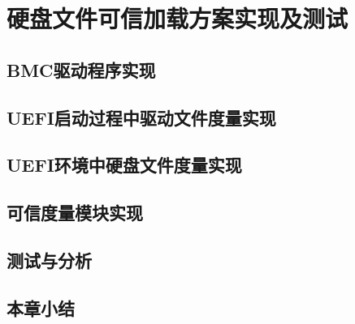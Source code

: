 %
%
\chapter{硬盘文件可信加载方案实现及测试}
\label{cha:test}
%
%
\section{BMC驱动程序实现}
%
%
\section{UEFI启动过程中驱动文件度量实现}
%
%
\section{UEFI环境中硬盘文件度量实现}
%
%
\section{可信度量模块实现}
%
%
\section{测试与分析}
%
%
\section{本章小结}

